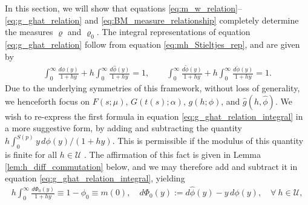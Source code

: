 \documentclass[jmp,graphicx]{revtex4-1}
\newcommand{\ph}{\hat{\phi}}
\newcommand{\pt}{\tilde{\phi}}
\newcommand{\pc}{\check{\phi}}
\begin{document}
In this section, we will show that equations
\eqref{eq:m_w_relation}--\eqref{eq:g_ghat_relation} and 
\eqref{eq:BM_measure_relationship} completely determine the measures
$\varrho$ and $\varrho_0$. The integral representations of equation
\eqref{eq:g_ghat_relation} follow from equation
\eqref{eq:mh_Stieltjes_rep}, and are given by  
%
\begin{align}\label{eq:g_ghat_relation_integral}
  \int_0^\infty\frac{d\phi(y)}{1+hy}+h\int_0^\infty\frac{d\ph(y)}{1+hy}=1,\qquad
  \int_0^\infty\frac{d\pt(y)}{1+hy}+h\int_0^\infty\frac{d\pc(y)}{1+hy}=1.
\end{align}
%
Due to the underlying symmetries of this framework, without loss of
generality, we henceforth focus on $F(s;\mu)$, $G(t(s);\alpha)$, $g(h;\phi)$,
and $\hat{g}(h,\ph)$. We wish to re-express the first formula in
equation \eqref{eq:g_ghat_relation_integral} in a more suggestive form,
by adding and subtracting the quantity
$h\int_0^{S(p)}y\,d\phi(y)/(1+hy)$. This is permissible if the modulus of
this quantity is finite for all $h\in\mathcal{U}$
\cite{Rudin:87,Folland:95}. The affirmation of this fact is given in 
Lemma \ref{lem:h_diff_commutation} below, and we may therefore add and
subtract it in equation \eqref{eq:g_ghat_relation_integral}, yielding   
%
%
\begin{align}\label{eq:n=0_measure_equivalence}
 h \int_0^\infty\frac{d\Phi_0(y)}{1+hy}\equiv1-\phi_0\equiv m(0),  \quad
 d\Phi_0(y):=d\ph(y)-y\,d\phi(y), \quad
 \forall \ h\in\mathcal{U},
\end{align}
\end{document}
